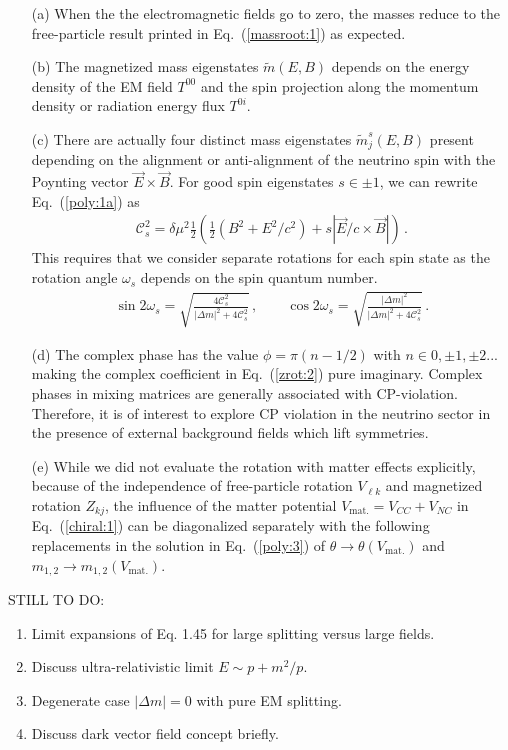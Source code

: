 \documentclass[addchapnum]{ws-rv961x669} %
\newcommand{\req}[1]{Eq.~(\ref{#1})}
\begin{document}
\begin{enumerate}[nosep]
    \item[(a)] When the the electromagnetic fields go to zero, the masses reduce to the free-particle result printed in \req{massroot:1} as expected.
    \item[(b)] The magnetized mass eigenstates $\widetilde m(E,B)$ depends on the energy density of the EM field $T^{00}$ and the spin projection along the momentum density or radiation energy flux $T^{0i}$.
    \item[(c)] There are actually four distinct mass eigenstates $\widetilde m_{j}^{s}(E,B)$ present depending on the alignment or anti-alignment of the neutrino spin with the Poynting vector $\vec{E}\times\vec{B}$. For good spin eigenstates $s\in\pm1$, we can rewrite \req{poly:1a} as
    \begin{align}
        \mathcal{C}^{2}_{s}=\delta\mu^{2}\frac{1}{2}\left(\frac{1}{2}(B^{2}+E^{2}/c^{2})+s|\vec{E}/c\times\vec{B}|\right)\,.
    \end{align}
    This requires that we consider separate rotations for each spin state as the rotation angle $\omega_{s}$ depends on the spin quantum number.
    \begin{align}
        \sin2\omega_{s}=\sqrt{\frac{4\mathcal{C}_{s}^{2}}{|\Delta m|^{2}+4\mathcal{C}_{s}^{2}}}\,,\qquad
        \cos2\omega_{s}=\sqrt{\frac{|\Delta m|^{2}}{|\Delta m|^{2}+4\mathcal{C}_{s}^{2}}}\,.
    \end{align}
    \item[(d)] The complex phase has the value $\phi=\pi(n-1/2)$ with $n\in0,\pm1,\pm2...$ making the complex coefficient in \req{zrot:2} pure imaginary. Complex phases in mixing matrices are generally associated with CP-violation. Therefore, it is of interest to explore CP violation in the neutrino sector in the presence of external background fields which lift symmetries.
    \item[(e)] While we did not evaluate the rotation with matter effects explicitly, because of the independence of free-particle rotation $V_{\ell k}$ and magnetized rotation $Z_{kj}$, the influence of the matter potential $V_\mathrm{mat.}=V_{CC}+V_{NC}$ in \req{chiral:1} can be diagonalized separately with the following replacements in the solution in \req{poly:3} of $\theta\rightarrow\theta(V_\mathrm{mat.})$ and $m_{1,2}\rightarrow m_{1,2}(V_\mathrm{mat.})$.
\end{enumerate}

STILL TO DO:
\begin{enumerate}
    \item Limit expansions of Eq. 1.45 for large splitting versus large fields.
    \item Discuss ultra-relativistic limit $E\sim p+m^{2}/p$.
    \item Degenerate case $|\Delta m|=0$ with pure EM splitting.
    \item Discuss dark vector field concept briefly.
\end{enumerate}
\end{document}
